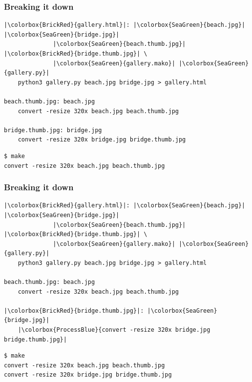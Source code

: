 \documentclass[xcolor=dvipsnames,t,compress]{beamer}
\begin{document}
\begin{frame}[fragile]
\frametitle{Breaking it down}
\vspace{-1em}
\begin{verbatim}
|\colorbox{BrickRed}{gallery.html}|: |\colorbox{SeaGreen}{beach.jpg}| |\colorbox{SeaGreen}{bridge.jpg}|
              |\colorbox{SeaGreen}{beach.thumb.jpg}| |\colorbox{BrickRed}{bridge.thumb.jpg}| \
			  |\colorbox{SeaGreen}{gallery.mako}| |\colorbox{SeaGreen}{gallery.py}|
	python3 gallery.py beach.jpg bridge.jpg > gallery.html

beach.thumb.jpg: beach.jpg
	convert -resize 320x beach.jpg beach.thumb.jpg

bridge.thumb.jpg: bridge.jpg
	convert -resize 320x bridge.jpg bridge.thumb.jpg
\end{verbatim}
\begin{verbatim}
$ make
convert -resize 320x beach.jpg beach.thumb.jpg
\end{verbatim}
\end{frame}

\begin{frame}[fragile]
\frametitle{Breaking it down}
\vspace{-1em}
\begin{verbatim}
|\colorbox{BrickRed}{gallery.html}|: |\colorbox{SeaGreen}{beach.jpg}| |\colorbox{SeaGreen}{bridge.jpg}|
              |\colorbox{SeaGreen}{beach.thumb.jpg}| |\colorbox{BrickRed}{bridge.thumb.jpg}| \
			  |\colorbox{SeaGreen}{gallery.mako}| |\colorbox{SeaGreen}{gallery.py}|
	python3 gallery.py beach.jpg bridge.jpg > gallery.html

beach.thumb.jpg: beach.jpg
	convert -resize 320x beach.jpg beach.thumb.jpg

|\colorbox{BrickRed}{bridge.thumb.jpg}|: |\colorbox{SeaGreen}{bridge.jpg}|
	|\colorbox{ProcessBlue}{convert -resize 320x bridge.jpg bridge.thumb.jpg}|
\end{verbatim}
\begin{verbatim}
$ make
convert -resize 320x beach.jpg beach.thumb.jpg
convert -resize 320x bridge.jpg bridge.thumb.jpg
\end{verbatim}
\end{frame}
\end{document}
